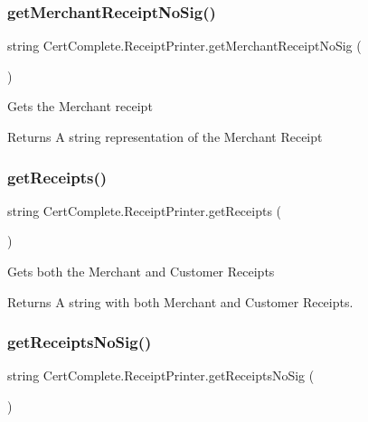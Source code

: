 \subsubsection{\texorpdfstring{get\+Merchant\+Receipt\+No\+Sig()}{getMerchantReceiptNoSig()}}
{\footnotesize\ttfamily string Cert\+Complete.\+Receipt\+Printer.\+get\+Merchant\+Receipt\+No\+Sig (\begin{DoxyParamCaption}{ }\end{DoxyParamCaption})\hspace{0.3cm}{\ttfamily [inline]}}



Gets the Merchant receipt 

\begin{DoxyReturn}{Returns}
A string representation of the Merchant Receipt
\end{DoxyReturn}
\mbox{\label{class_cert_complete_1_1_receipt_printer_af48884b7e27f8c5dd115880a7ae4ee35}} 
\subsubsection{\texorpdfstring{get\+Receipts()}{getReceipts()}}
{\footnotesize\ttfamily string Cert\+Complete.\+Receipt\+Printer.\+get\+Receipts (\begin{DoxyParamCaption}{ }\end{DoxyParamCaption})\hspace{0.3cm}{\ttfamily [inline]}}



Gets both the Merchant and Customer Receipts 

\begin{DoxyReturn}{Returns}
A string with both Merchant and Customer Receipts.
\end{DoxyReturn}
\mbox{\label{class_cert_complete_1_1_receipt_printer_a98603c743b4fc78d8a9a57bc01b3c107}} 
\subsubsection{\texorpdfstring{get\+Receipts\+No\+Sig()}{getReceiptsNoSig()}}
{\footnotesize\ttfamily string Cert\+Complete.\+Receipt\+Printer.\+get\+Receipts\+No\+Sig (\begin{DoxyParamCaption}{ }\end{DoxyParamCaption})\hspace{0.3cm}{\ttfamily [inline]}}



